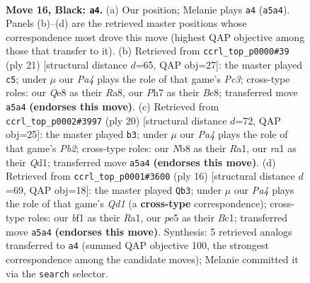 \documentclass[11pt]{article}
\begin{document}
\clearpage

\begin{figure}[p]\centering
\begin{subfigure}{0.46\textwidth}\centering
\resizebox{\linewidth}{!}{%
\newchessgame
\chessboard[
  setfen={1nb1qrk1/r1p1nppp/1p2p3/p2pP3/3P1P2/2N5/PPP2KPP/R2Q1BNR b - - 3 16},
  showmover=false,
  pgfstyle=straightmove, color=movearrow, markmove={a5-a4}
]}
\caption{}
\end{subfigure}\hfill
\begin{subfigure}{0.46\textwidth}\centering
\resizebox{\linewidth}{!}{%
\newchessgame
\chessboard[
  setfen={r1b2rk1/p1pnqppp/2pp4/4p3/2P1P3/3P1N1P/P1P2PP1/1RBQ1RK1 b - - 2 11},
  showmover=false,
  pgfstyle=straightmove, color=movearrow, markmove={c6-c5}
]}
\caption{}
\end{subfigure}
\\[4pt]
\begin{subfigure}{0.46\textwidth}\centering
\resizebox{\linewidth}{!}{%
\newchessgame
\chessboard[
  setfen={1nrqk2r/1p2bppp/p2ppn2/2p5/2P1PP2/2NP4/PP4PP/R1BQNRK1 w k - 1 11},
  showmover=false,
  pgfstyle=straightmove, color=movearrow, markmove={b2-b3}
]}
\caption{}
\end{subfigure}\hfill
\begin{subfigure}{0.46\textwidth}\centering
\resizebox{\linewidth}{!}{%
\newchessgame
\chessboard[
  setfen={r2qk1nr/pppn1pbp/4p1p1/3p4/3P1P2/2P3P1/PP3PBP/RNBQ1RK1 w kq - 1 9},
  showmover=false,
  pgfstyle=straightmove, color=movearrow, markmove={d1-b3}
]}
\caption{}
\end{subfigure}
\caption{\textbf{Move 16, Black: \texttt{a4}.} (a) Our position; Melanie plays \texttt{a4} (\texttt{a5a4}). Panels (b)--(d) are the retrieved master positions whose correspondence most drove this move (highest QAP objective among those that transfer to it). (b) Retrieved from \texttt{ccrl\_top\_p0000\#39} (ply 21) [structural distance $d$=65, QAP obj=27]: the master played \texttt{c5}; under $\mu$ our \emph{Pa4} plays the role of that game's \emph{Pc3}; cross-type roles: our \emph{Q}e8 as their \emph{R}a8, our \emph{P}h7 as their \emph{B}c8; transferred move \texttt{a5a4} \textbf{(endorses this move)}. (c) Retrieved from \texttt{ccrl\_top\_p0002\#3997} (ply 20) [structural distance $d$=72, QAP obj=25]: the master played \texttt{b3}; under $\mu$ our \emph{Pa4} plays the role of that game's \emph{Pb2}; cross-type roles: our \emph{N}b8 as their \emph{R}a1, our \emph{r}a1 as their \emph{Q}d1; transferred move \texttt{a5a4} \textbf{(endorses this move)}. (d) Retrieved from \texttt{ccrl\_top\_p0001\#3600} (ply 16) [structural distance $d$=69, QAP obj=18]: the master played \texttt{Qb3}; under $\mu$ our \emph{Pa4} plays the role of that game's \emph{Qd1} (a \textbf{cross-type} correspondence); cross-type roles: our \emph{b}f1 as their \emph{R}a1, our \emph{p}e5 as their \emph{B}c1; transferred move \texttt{a5a4} \textbf{(endorses this move)}. Synthesis: 5 retrieved analogs transferred to \texttt{a4} (summed QAP objective 100, the strongest correspondence among the candidate moves); Melanie committed it via the \texttt{search} selector.}
\label{fig:thought-m31}
\end{figure}
\end{document}
